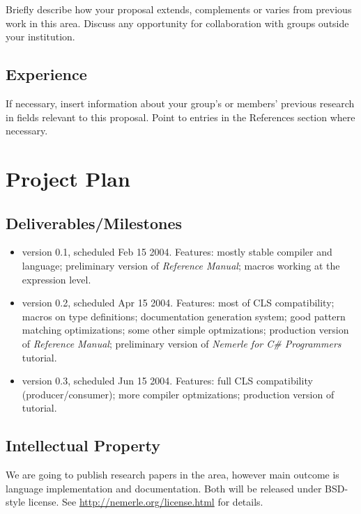 \documentclass[a4paper,11pt]{article}
\begin{document}
Briefly describe how your proposal extends, complements or varies from
previous work in this area. Discuss any opportunity for collaboration
with groups outside your institution.


\subsection{Experience}

If necessary, insert information about your group's or members' previous
research in fields relevant to this proposal. Point to entries in the
References section where necessary.

\section{Project Plan}

\subsection{Deliverables/Milestones}

\begin{itemize}
\item version 0.1, scheduled Feb 15 2004. Features:
  mostly stable compiler and language;
  preliminary version of \textit{Reference Manual}; 
  macros working at the expression level.

\item version 0.2, scheduled Apr 15 2004. Features:
  most of CLS compatibility;
  macros on type definitions;
  documentation generation system;
  good pattern matching optimizations;
  some other simple optmizations;
  production version of \textit{Reference Manual};
  preliminary version of \textit{Nemerle for C\# Programmers} tutorial.

\item version 0.3, scheduled Jun 15 2004. Features:
  full CLS compatibility (producer/consumer);
  more compiler optmizations;
  production version of tutorial.
\end{itemize}

\subsection{Intellectual Property}

We are going to publish research papers in the area, however main outcome
is language implementation and documentation. Both will be released
under BSD-style license. See \url{http://nemerle.org/license.html}
for details.
\end{document}
